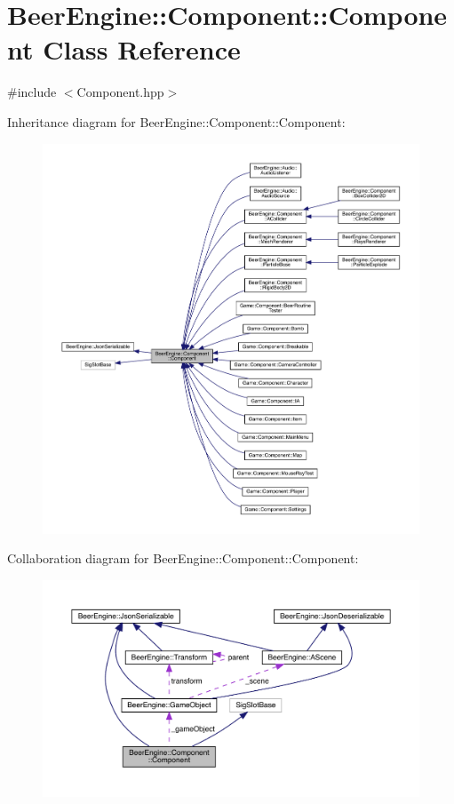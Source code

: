 \hypertarget{class_beer_engine_1_1_component_1_1_component}{}\section{Beer\+Engine\+:\+:Component\+:\+:Component Class Reference}
\label{class_beer_engine_1_1_component_1_1_component}


{\ttfamily \#include $<$Component.\+hpp$>$}



Inheritance diagram for Beer\+Engine\+:\+:Component\+:\+:Component\+:
\nopagebreak
\begin{figure}[H]
\begin{center}
\leavevmode
\includegraphics[width=350pt]{class_beer_engine_1_1_component_1_1_component__inherit__graph}
\end{center}
\end{figure}


Collaboration diagram for Beer\+Engine\+:\+:Component\+:\+:Component\+:
\nopagebreak
\begin{figure}[H]
\begin{center}
\leavevmode
\includegraphics[width=350pt]{class_beer_engine_1_1_component_1_1_component__coll__graph}
\end{center}
\end{figure}
